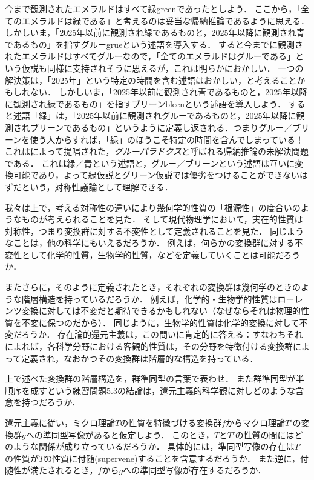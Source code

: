 \documentclass[11pt,a4paper]{jsarticle}
\begin{document}
\begin{example} 
今まで観測されたエメラルドはすべて緑greenであったとしよう．
ここから，「全てのエメラルドは緑である」と考えるのは妥当な帰納推論であるように思える．
しかしいま，「2025年以前に観測され緑であるものと，2025年以降に観測され青であるもの」を指すグルーgrueという述語を導入する．
すると今までに観測されたエメラルドはすべてグルーなので，「全てのエメラルドはグルーである」という仮説も同様に支持されそうに思えるが，これは明らかにおかしい．
一つの解決策は，「2025年」という特定の時間を含む述語はおかしい，と考えることかもしれない．
しかしいま，「2025年以前に観測され青であるものと，2025年以降に観測され緑であるもの」を指すブリーンbleenという述語を導入しよう．
すると述語「緑」は，「2025年以前に観測されグルーであるものと，2025年以降に観測されブリーンであるもの」というように定義し返される．つまりグルー／ブリーンを使う人からすれば，「緑」のほうこそ特定の時間を含んでしまっている！
これは\cite{Goodman1955-nr}によって提唱された，\emph{グルーパラドクス}と呼ばれる帰納推論の未解決問題である．
これは緑／青という述語と，グルー／ブリーンという述語は互いに変換可能であり，よって緑仮説とグリーン仮説では優劣をつけることができないはずだという，対称性議論として理解できる．
\end{example}

\begin{example}[還元主義]
我々は上で，考える対称性の違いにより幾何学的性質の「根源性」の度合いのようなものが考えられることを見た．
そして現代物理学において，実在的性質は対称性，つまり変換群に対する不変性として定義されることを見た．
同じようなことは，他の科学にもいえるだろうか．
例えば，何らかの変換群に対する不変性として化学的性質，生物学的性質，などを定義していくことは可能だろうか．

またさらに，そのように定義されたとき，それぞれの変換群は幾何学のときのような階層構造を持っているだろうか．
例えば，化学的・生物学的性質はローレンツ変換に対しては不変だと期待できるかもしれない（なぜならそれは物理的性質を不変に保つのだから）．
同じように，生物学的性質は化学的変換に対して不変だろうか．
存在論的還元主義は，この問いに肯定的に答える：すなわちそれによれば，各科学分野における客観的性質は，その分野を特徴付ける変換群によって定義され，なおかつその変換群は階層的な構造を持っている．
\end{example}

\begin{exercise}
上で述べた変換群の階層構造を，群準同型の言葉で表わせ．
また群準同型が半順序を成すという練習問題5.3の結論は，還元主義的科学観に対しどのような含意を持つだろうか．
\end{exercise}

\begin{exercise}
還元主義に従い，ミクロ理論$T$の性質を特徴づける変換群$f$からマクロ理論$T'$の変換群$g$への準同型写像があると仮定しよう．
このとき，$T$と$T'$の性質の間にはどのような関係が成り立っているだろうか．
具体的には，準同型写像の存在は$T'$の性質が$T$の性質に付随(supervene)することを含意するだろうか．
また逆に，付随性が満たされるとき，$f$から$g$への準同型写像が存在するだろうか．
\end{exercise}




\end{document}
